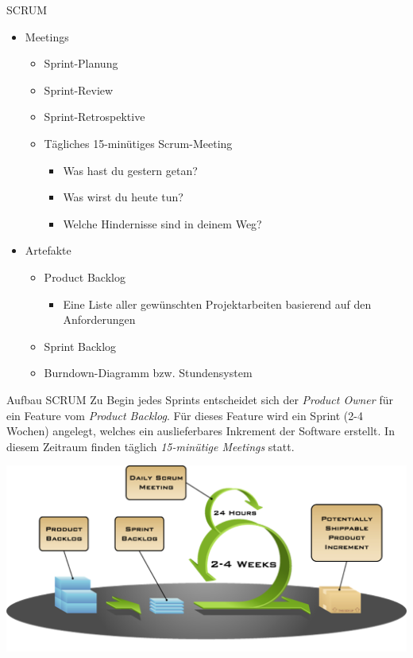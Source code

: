 \begin{defi}{SCRUM}
\begin{itemize}
\begin{itemize}
              \end{itemize}
        \item Meetings
              \begin{itemize}
                  \item Sprint-Planung
                  \item Sprint-Review
                  \item Sprint-Retrospektive
                  \item Tägliches 15-minütiges Scrum-Meeting
                        \begin{itemize}
                            \item Was hast du gestern getan?
                            \item Was wirst du heute tun?
                            \item Welche Hindernisse sind in deinem Weg?
                        \end{itemize}
              \end{itemize}
        \item Artefakte
              \begin{itemize}
                  \item Product Backlog
                        \begin{itemize}
                            \item Eine Liste aller gewünschten Projektarbeiten basierend auf den Anforderungen
                        \end{itemize}
                  \item Sprint Backlog
                  \item Burndown-Diagramm bzw. Stundensystem
              \end{itemize}
    \end{itemize}
\end{defi}

\begin{bonus}{Aufbau SCRUM}
    Zu Begin jedes Sprints entscheidet sich der \emph{Product Owner} für ein Feature vom \emph{Product Backlog}.
    Für dieses Feature wird ein Sprint (2-4 Wochen) angelegt, welches ein auslieferbares Inkrement der Software erstellt.
    In diesem Zeitraum finden täglich \emph{15-minütige Meetings} statt.

    \includegraphics[width=\textwidth]{includes/figures/bonus_SCRUM.png}
\end{bonus}